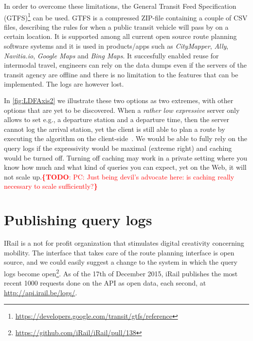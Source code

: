 \documentclass{sig-alternate}
\newcommand{\todo}[1]{\noindent\textcolor{red}{{\bf \{TODO}: #1{\bf \}}}}
\begin{document}
In order to overcome these limitations, the General Transit Feed Specification (GTFS)\footnote{\url{https://developers.google.com/transit/gtfs/reference}} can be used. 
GTFS is a compressed ZIP-file containing a couple of CSV files, describing the rules for when a public transit vehicle will pass by on a certain location.
It is supported among all current open source route planning software systems and it is used in products/apps such as \emph{CityMapper}, \emph{Ally}, \emph{Navitia.io}, \emph{Google Maps} and \emph{Bing Maps}.
It succesfully enabled reuse for intermodal travel, engineers can rely on the data dumps even if the servers of the transit agency are offline and there is no limitation to the features that can be implemented.
The logs are however lost.

In \cref{fig:LDFAxis2} we illustrate these two options as two extremes, with other options that are yet to be discovered.
When a \emph{rather low expressive} server only allows to set e.g., a departure station and a departure time, then the server cannot log the arrival station, yet the client is still able to plan a route by executing the algorithm on the client-side~\cite{lc}.
We would be able to fully rely on the query logs if the expressivity would be maximal (extreme right) and caching would be turned off.
Turning off caching may work in a private setting where you know how much and what kind of queries you can expect, yet on the Web, it will not scale up.\todo{PC: Just being devil's advocate here: is caching really necessary to scale sufficiently?}

\section{Publishing query logs}
\label{sec:publishingquerylogs}

IRail is a not for profit organization that stimulates digital creativity concerning mobility.
The interface that takes care of the route planning interface is open source, and we could easily suggest a change to the system in which the query logs become open\footnote{\url{https://github.com/iRail/iRail/pull/138}}.
As of the 17th of December 2015, iRail publishes the most recent 1000 requests done on the API as open data, each second, at \url{http://api.irail.be/logs/}.
\end{document}
